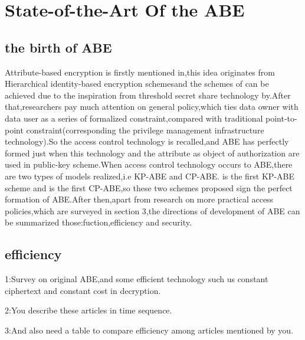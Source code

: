 \section{State-of-the-Art Of the ABE}
\subsection{the birth of ABE}
Attribute-based encryption is firstly mentioned in\cite{fuzz},this idea originates from Hierarchical identity-based encryption schemes\cite{Yao:Id-based encryption for complex hierarchies with applications to forward security and broadcast encryption}and the schemes of \cite{fuzz} can be achieved due to the inspiration from threshold secret share technology by\cite{ Adi Shamir:How to Share a Secret}.After that,researchers pay much attention on general policy,which ties data owner with data user as a series of formalized constraint,compared with traditional point-to-point constraint(corresponding the privilege management infrastructure technology).So the access control technology is recalled,and ABE has perfectly formed just when this technology and the attribute as object of authorization are used in public-key scheme.When access control technology occurs to ABE,there are two types of models realized,i.e KP-ABE and CP-ABE.\cite{classical:KP-ABE} is the first KP-ABE scheme and \cite{first:CP-ABE} is the first CP-ABE,so these two schemes proposed sign the perfect formation of ABE.After then,apart from research on more practical access policies,which are surveyed in section 3,the directions of development of ABE can be summarized those:fuction,efficiency and security.
\subsection{efficiency}
1:Survey on original ABE,and some efficient technology such us constant ciphertext and constant cost in decryption.

2:You describe these articles in time sequence.

3:And also need a table to compare efficiency among articles mentioned by you.

